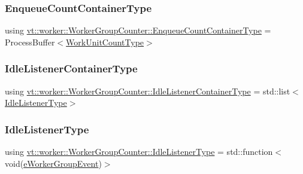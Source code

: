 \subsubsection{\texorpdfstring{Enqueue\+Count\+Container\+Type}{EnqueueCountContainerType}}
{\footnotesize\ttfamily using \hyperlink{structvt_1_1worker_1_1_worker_group_counter_ab0ceac7975b91fa9c08f8c416a4ea1cc}{vt\+::worker\+::\+Worker\+Group\+Counter\+::\+Enqueue\+Count\+Container\+Type} =  Process\+Buffer$<$\hyperlink{namespacevt_1_1worker_a8080c49350b0520151601a8b24d6c6cf}{Work\+Unit\+Count\+Type}$>$}

\mbox{\label{structvt_1_1worker_1_1_worker_group_counter_a27ecc5576966def3b786c8470e3fbf9d}} 
\subsubsection{\texorpdfstring{Idle\+Listener\+Container\+Type}{IdleListenerContainerType}}
{\footnotesize\ttfamily using \hyperlink{structvt_1_1worker_1_1_worker_group_counter_a27ecc5576966def3b786c8470e3fbf9d}{vt\+::worker\+::\+Worker\+Group\+Counter\+::\+Idle\+Listener\+Container\+Type} =  std\+::list$<$\hyperlink{structvt_1_1worker_1_1_worker_group_counter_ae91ad4af172549bb99e1b7c32a1a0f71}{Idle\+Listener\+Type}$>$}

\mbox{\label{structvt_1_1worker_1_1_worker_group_counter_ae91ad4af172549bb99e1b7c32a1a0f71}} 
\subsubsection{\texorpdfstring{Idle\+Listener\+Type}{IdleListenerType}}
{\footnotesize\ttfamily using \hyperlink{structvt_1_1worker_1_1_worker_group_counter_ae91ad4af172549bb99e1b7c32a1a0f71}{vt\+::worker\+::\+Worker\+Group\+Counter\+::\+Idle\+Listener\+Type} =  std\+::function$<$void(\hyperlink{namespacevt_1_1worker_abcb798436f1cdc4fab035def5b912d1f}{e\+Worker\+Group\+Event})$>$}



